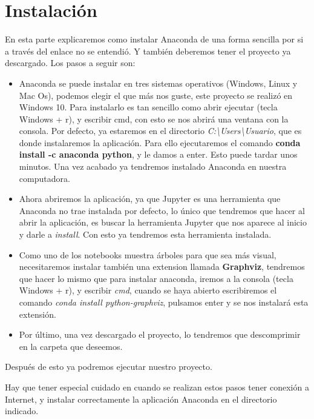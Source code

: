 \section{Instalación}
En esta parte explicaremos como instalar Anaconda de una forma sencilla por si a través del enlace no se entendió. Y también deberemos tener el proyecto ya descargado. Los pasos a seguir son:
\begin{itemize}
	\item Anaconda se puede instalar en tres sistemas operativos (Windows, Linux y Mac Os), podemos elegir el que más nos guste, este proyecto se realizó en Windows 10. Para instalarlo es tan sencillo como abrir ejecutar (tecla Windows + r), y escribir cmd, con esto se nos abrirá una ventana con la consola. Por defecto, ya estaremos en el directorio \textit{C:\textbackslash Users\textbackslash Usuario}, que es donde instalaremos la aplicación. Para ello ejecutaremos el comando \textbf{conda install -c anaconda python}, y le damos a enter. Esto puede tardar unos minutos. Una vez acabado ya tendremos instalado Anaconda en nuestra computadora.
	\item Ahora abriremos la aplicación, ya que Jupyter es una herramienta que Anaconda no trae instalada por defecto, lo único que tendremos que hacer al abrir la aplicación, es buscar la herramienta Jupyter que nos aparece al inicio y darle a \textit{install}. Con esto ya tendremos esta herramienta instalada.
	\item Como uno de los notebooks muestra árboles para que sea más visual, necesitaremos instalar también una extension llamada \textbf{Graphviz}, tendremos que hacer lo mismo que para instalar anaconda, iremos a la consola (tecla Windows + r), y escribir \textit{cmd}, cuando se haya abierto escribiremos el comando \textit{conda install python-graphviz}, pulsamos enter y se nos instalará esta extensión. 
	\item Por último, una vez descargado el proyecto, lo tendremos que descomprimir en la carpeta que deseemos.
\end{itemize}
Después de esto ya podremos ejecutar nuestro proyecto.

Hay que tener especial cuidado en cuando se realizan estos pasos tener conexión a Internet, y instalar correctamente la aplicación Anaconda en el directorio indicado.
